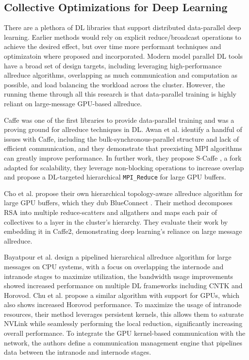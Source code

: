 \subsection{Collective Optimizations for Deep Learning}
There are a plethora of DL libraries that support distributed data-parallel deep learning.
Earlier methods would rely on explicit reduce/broadcast operations to achieve the desired effect, but over time more performant techniques and optimizatoin where proposed and incorporated.
Modern model parallel DL tools have a broad set of design targets, including leveraging high-performance allreduce algorithms, overlapping as much communication and computation as possible, and load balancing the workload across the cluster.
However, the running theme through all this research is that data-parallel training is highly reliant on large-message GPU-based allreduce. 

Caffe was one of the first libraries to provide data-parallel training and was a proving ground for allreduce techniques in DL.
Awan et al. \cite{Awan2017InDepthPerfCharOfDNN} identify a handful of issues with Caffe, including the bulk-synchronous-parallel structure and lack of efficient communication, and they demonstrate that preexisting MPI algorithms can greatly improve performance.
In further work, they propose S-Caffe \cite{Awan2017SCaffe}, a fork adapted for scalability, they leverage non-blocking operations to increase overlap and propose a DL-targeted hierarchical \texttt{MPI\_Reduce} for large GPU buffers.

Cho et al. propose their own hierarchical topology-aware allreduce algorithm for large GPU buffers, which they dub BlueConnect \cite{Cho2019BlueConnect}. 
Their method decomposes RSA into multiple reduce-scatters and allgathers and maps each pair of collectives to a layer in the cluster's hierarchy.
They evaluate their work by embedding it in Caffe2, demonstrating deep learning's reliance on large message allreduce.

Bayatpour et al. \cite{Bayatpour2018SALaR} design a pipelined hierarchical allreduce algorithm for large messages on CPU systems, with a focus on overlapping the internode and intranode stages to maximize utilization, the bandwidth usage improvements showed increased performance on multiple DL frameworks including CNTK and Horovod. 
Chu et al. \cite{Chu2020NVGroup} propose a similar algorithm with support for GPUs, which also shows increased Horovod performance.
To maximize the usage of intranode resources, their method leverages persistent kernels, this allows them to saturate NVLink while seamlessly performing the local reduction, significantly increasing overall performance. 
To integrate the GPU kernel-based communication with the network, the authors define a communication management engine that pipelines data between the intranode and internode stages.

